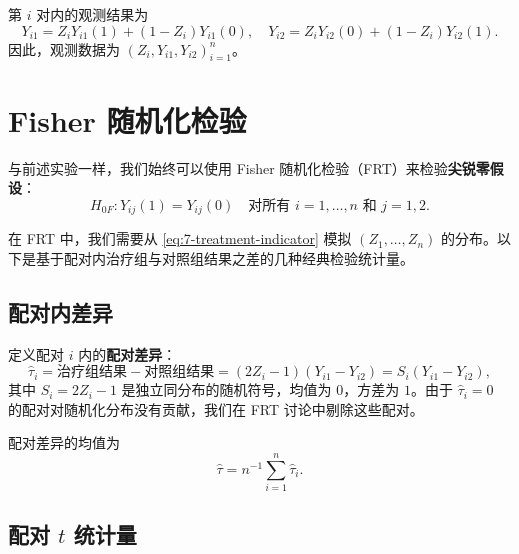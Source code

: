 第 $i$ 对内的观测结果为
\[
Y_{i1} = Z_i Y_{i1}(1) + (1 - Z_i) Y_{i1}(0), \quad
Y_{i2} = Z_i Y_{i2}(0) + (1 - Z_i) Y_{i2}(1).
\]
因此，观测数据为 $(Z_i, Y_{i1}, Y_{i2})_{i=1}^n$。

\section{Fisher 随机化检验}\label{sec:7-frt}

与前述实验一样，我们始终可以使用 Fisher 随机化检验（FRT）来检验\textbf{尖锐零假设}：
\begin{equation}
H_{0F}: Y_{ij}(1) = Y_{ij}(0) \quad \text{对所有 } i = 1, \dots, n \text{ 和 } j = 1, 2.
\label{eq:7-sharp-null}
\end{equation}

在 FRT 中，我们需要从 \cref{eq:7-treatment-indicator} 模拟 $(Z_1, \ldots, Z_n)$ 的分布。以下是基于配对内治疗组与对照组结果之差的几种经典检验统计量。

\subsection{配对内差异}\label{sec:7-within-pair-diff}

定义配对 $i$ 内的\textbf{配对差异}：
\begin{equation}
\hat\tau_i = \text{治疗组结果} - \text{对照组结果} = (2Z_i - 1)(Y_{i1} - Y_{i2}) = S_i(Y_{i1} - Y_{i2}),
\label{eq:7-pair-diff}
\end{equation}
其中 $S_i = 2Z_i - 1$ 是独立同分布的随机符号，均值为 $0$，方差为 $1$。由于 $\hat\tau_i = 0$ 的配对对随机化分布没有贡献，我们在 FRT 讨论中剔除这些配对。

配对差异的均值为
\begin{equation}
\hat\tau = n^{-1} \sum_{i=1}^n \hat\tau_i.
\label{eq:7-avg-tau}
\end{equation}

\subsection{配对 $t$ 统计量}\label{sec:7-paired-t}

